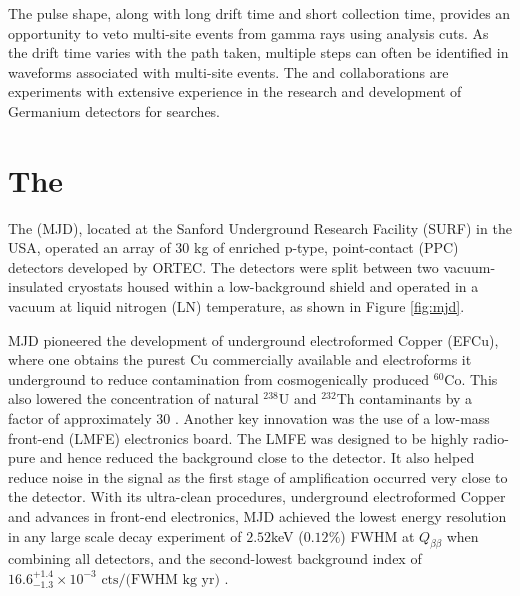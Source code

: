 The pulse shape, along with long drift time and short collection time, provides an opportunity to veto multi-site events from gamma rays using analysis cuts. As the drift time varies with the path taken, multiple steps can often be identified in waveforms associated with multi-site events. The {\MJ} and {\Gerda} collaborations are experiments with extensive experience in the research and development of Germanium detectors for {\onbb} searches.


\section{The {\MJD}}

The {\MJD} (MJD), located at the Sanford Underground Research Facility (SURF) in the USA, operated an array of 30 kg of enriched p-type, point-contact (PPC) detectors developed by ORTEC. The detectors were split between two vacuum-insulated cryostats housed within a low-background shield and operated in a vacuum at liquid nitrogen (LN) temperature, as shown in Figure \ref{fig:mjd}. 

MJD pioneered the development of underground electroformed Copper (EFCu), where one obtains the purest Cu commercially available and electroforms it underground to reduce contamination from cosmogenically produced $^{60}$Co. This also lowered the concentration of natural $^{238}$U and $^{232}$Th contaminants by a factor of approximately 30 \cite{Abgrall:2016cct}. Another key innovation was the use of a low-mass front-end (LMFE) electronics board. The LMFE was designed to be highly radio-pure and hence reduced the background close to the detector. It also helped reduce noise in the signal as the first stage of amplification occurred very close to the detector. With its ultra-clean procedures, underground electroformed Copper and advances in front-end electronics, MJD achieved the lowest energy resolution in any large scale {\onbb} decay experiment of $2.52$keV ($0.12\%$) FWHM at $Q_{\beta\beta}$ when combining all detectors, and the second-lowest background index of $16.6^{+1.4}_{-1.3} \times 10^{-3} \text{ cts/(FWHM kg yr)}$ \cite{Majorana_final}.

